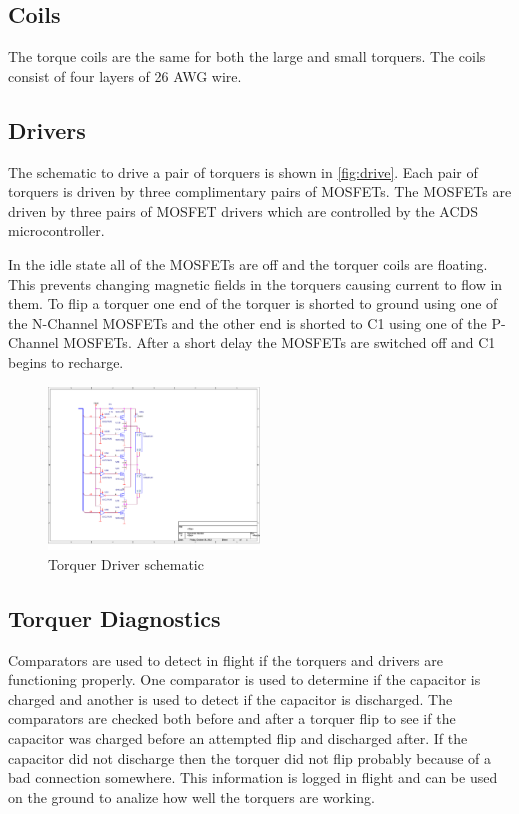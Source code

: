 \subsection{Coils}

The torque coils are the same for both the large and small torquers. The coils consist of four layers of 26 AWG wire.

\subsection{Drivers}

The schematic to drive a pair of torquers is shown in \autoref{fig:drive}. Each pair of torquers is driven by three complimentary pairs of \acp{MOSFET}.  The \acp{MOSFET} are driven by three pairs of \ac{MOSFET} drivers which are controlled by the \ac{ACDS} microcontroller.

In the idle state all of the \acp{MOSFET} are off and the torquer coils are floating. This prevents changing magnetic fields in the torquers causing current to flow in them. To flip a torquer one end of the torquer is shorted to ground using one of the N-Channel \acp{MOSFET} and the other end is shorted to C1 using one of the P-Channel \acp{MOSFET}. After a short delay the \acp{MOSFET} are switched off and C1 begins to recharge.

\begin{figure}[H]
    \centering
    \includegraphics[width=0.5\textwidth]{Figures/driverSchematic}
    \caption{Torquer Driver schematic}
    \label{fig:drive}
\end{figure}

\subsection{Torquer Diagnostics}

Comparators are used to detect in flight if the torquers and drivers are functioning properly. One comparator is used to determine if the capacitor is charged and another is used to detect if the capacitor is discharged. The comparators are checked both before and after a torquer flip to see if the capacitor was charged before an attempted flip and discharged after. If the capacitor did not discharge then the torquer did not flip probably because of a bad connection somewhere. This information is logged in flight and can be used on the ground to analize how well the torquers are working.

